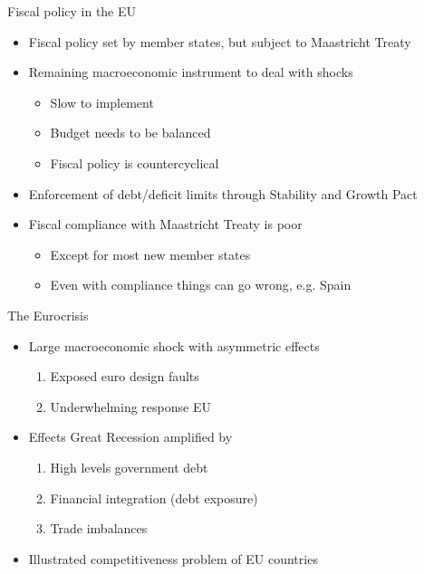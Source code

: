 \documentclass{beamer}
\begin{document}
\begin{frame}{Fiscal policy in the EU}
  \begin{itemize}
    \item Fiscal policy set by member states, but subject to Maastricht Treaty
    \medskip
    \item Remaining macroeconomic instrument to deal with shocks
    \begin{itemize}
      \item Slow to implement
      \item Budget needs to be balanced
      \item Fiscal policy is countercyclical
    \end{itemize}
    \medskip
    \item Enforcement of debt/deficit limits through Stability and Growth Pact
    \medskip
    \item Fiscal compliance with Maastricht Treaty is poor
    \begin{itemize}
      \item Except for most new member states
      \item Even with compliance things can go wrong, e.g. Spain
    \end{itemize}
  \end{itemize}
\end{frame}

\begin{frame}{The Eurocrisis}
  \begin{itemize}
    \item Large macroeconomic shock with asymmetric effects
    \begin{enumerate}
      \item Exposed euro design faults
      \item Underwhelming response EU
    \end{enumerate}
    \medskip
    \item Effects Great Recession amplified by 
    \begin{enumerate}
      \item High levels government debt
      \item Financial integration (debt exposure)
      \item Trade imbalances
    \end{enumerate}
    \medskip
    \item Illustrated competitiveness problem of EU countries
  \end{itemize}
\end{frame}
\end{document}
